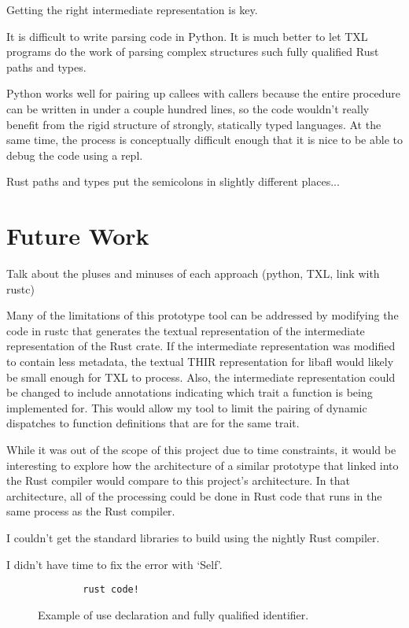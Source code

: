 \documentclass[11pt]{article}
\begin{document}
Getting the right intermediate representation is key.

It is difficult to write parsing code in Python.
It is much better to let TXL programs do the work of parsing complex structures such fully qualified Rust paths and types.

Python works well for pairing up callees with callers because the entire procedure can be written in under a couple hundred lines, so the code wouldn't really benefit from the rigid structure of strongly, statically typed languages.
At the same time, the process is conceptually difficult enough that it is nice to be able to debug the code using a repl.

Rust paths and types put the semicolons in slightly different places...

\section{Future Work}

Talk about the pluses and minuses of each approach (python, TXL, link with rustc)

Many of the limitations of this prototype tool can be addressed by modifying the code in rustc that generates the textual representation of the intermediate representation of the Rust crate.
If the intermediate representation was modified to contain less metadata, the textual THIR representation for libafl would likely be small enough for TXL to process.
Also, the intermediate representation could be changed to include annotations indicating which trait a function is being implemented for.
This would allow my tool to limit the pairing of dynamic dispatches to function definitions that are for the same trait.

While it was out of the scope of this project due to time constraints, it would be interesting to explore how the architecture of a similar prototype that linked into the Rust compiler would compare to this project's architecture.
In that architecture, all of the processing could be done in Rust code that runs in the same process as the Rust compiler.

I couldn't get the standard libraries to build using the nightly Rust compiler.

I didn't have time to fix the error with `Self'.

\begin{figure}
    \caption{Example of use declaration and fully qualified identifier.}
    \label{fig:qualifiers}
    \begin{lstlisting}
        rust code!
    \end{lstlisting}
\end{figure}
\end{document}
